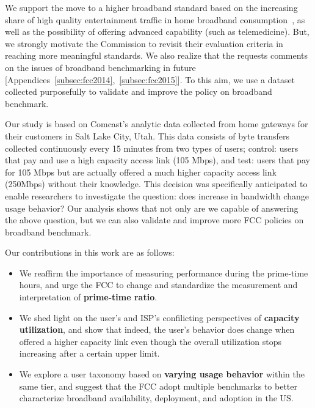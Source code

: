 We support the move to a higher broadband standard based on the increasing 
share of high quality entertainment traffic in home broadband 
consumption~\cite{sandvine2014report1,sandvine2014report2}, as well as the 
possibility of offering advanced capability (such as telemedicine). But, we 
strongly motivate the Commission to revisit their evaluation criteria in 
reaching more meaningful standards. We also realize that the \FCC requests 
comments on the issues of broadband benchmarking in 
future [Appendices~\ref{subsec:fcc2014},~\ref{subsec:fcc2015}]. To this aim, we use a
dataset collected purposefully to validate and 
improve the \FCC policy on broadband benchmark.

Our study is based on Comcast's analytic data collected from home gateways for their customers in
Salt Lake City, Utah. This data consists of byte transfers collected continuously every 15 minutes
from two types of users; control: users that pay and use a high capacity access link (105 Mbps), and
test: users that pay for 105 Mbps but are actually offered a much higher capacity access link
(250Mbps) without their knowledge. This decision was specifically anticipated to enable researchers
to investigate the question: does increase in bandwidth change usage behavior? 
Our analysis shows that not only are we capable of answering the above 
question, but we can also validate and improve more FCC policies on broadband 
benchmark.

Our contributions in this work are as follows:
\begin{itemize}
\itemsep0em
\item We reaffirm the importance of measuring performance during the 
prime-time hours, and urge the FCC to change and standardize 
the measurement and interpretation of \textbf{prime-time ratio}. 
\item We shed light on the user's and ISP's confilicting perspectives 
of \textbf{capacity utilization}, and show that indeed, the user's behavior 
does change when offered a higher capacity link even though the 
overall utilization stops increasing after a certain upper limit.
\item We explore a user taxonomy based on \textbf{varying usage behavior} 
within the same tier, and suggest that the FCC adopt multiple benchmarks 
to better characterize broadband availability, deployment, and adoption in the 
US.
\end{itemize}

